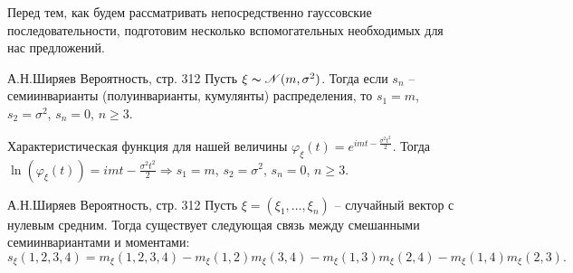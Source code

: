 		Перед тем, как будем рассматривать непосредственно гауссовские последовательности, подготовим несколько вспомогательных необходимых для нас предложений.
		
		\begin{Proposal}{А.Н.Ширяев Вероятность, стр. 312}
			Пусть $\xi \thicksim \mathscr{N}(m, \sigma^2)$. Тогда если $s_n$ -- семиинварианты (полуинварианты, кумулянты) распределения, то $s_1 = m$, $s_2 = \sigma^2$, $s_n = 0$, $n \geqslant 3$.
		\end{Proposal}
		
		\begin{Proof}
			Характеристическая функция для нашей величины $\varphi_\xi(t) = e^{imt - \frac{\sigma^2 t^2}{2}}$. Тогда $\ln(\varphi_\xi(t)) = imt - \frac{\sigma^2 t^2}{2} \Longrightarrow s_1 = m$, $s_2 = \sigma^2$, $s_n = 0$, $n \geqslant 3$.
		\end{Proof}
		\newline		

		\begin{Proposal}{А.Н.Ширяев Вероятность, стр. 312}
			Пусть $\xi = (\xi_1, \ldots, \xi_n)$ -- случайный вектор с нулевым средним. Тогда существует следующая связь между смешанными семиинвариантами и моментами:
			\begin{equation*}
				s_\xi(1, 2, 3, 4) = m_\xi(1, 2, 3, 4) - m_\xi(1, 2) m_\xi(3, 4) - m_\xi(1, 3) m_\xi(2, 4) - m_\xi(1, 4) m_\xi(2, 3).
			\end{equation*}
		\end{Proposal}
	
